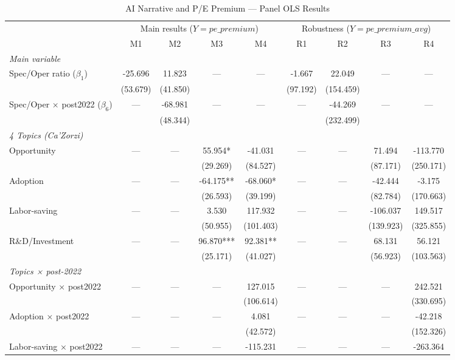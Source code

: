 \begin{table}[htbp]
\centering
\caption{AI Narrative and P/E Premium — Panel OLS Results}
\label{tab:regression_full}
\small
\begin{tabular}{lcccc|cccc}
\hline\hline
 & \multicolumn{4}{c|}{Main results ($Y = pe\_premium$)} & \multicolumn{4}{c}{Robustness ($Y = pe\_premium\_avg$)} \\
 & M1 & M2 & M3 & M4 & R1 & R2 & R3 & R4 \\
\hline
\multicolumn{9}{l}{\textit{Main variable}}\\
\quad Spec/Oper ratio ($\beta_1$) & -25.696 & 11.823 & — & — & -1.667 & 22.049 & — & — \\
  & (53.679) & (41.850) &  &  & (97.192) & (154.459) &  &  \\
\quad Spec/Oper × post2022 ($\beta_6$) & — & -68.981 & — & — & — & -44.269 & — & — \\
  &  & (48.344) &  &  &  & (232.499) &  &  \\
\multicolumn{9}{l}{\textit{4 Topics (Ca'Zorzi)}}\\
\quad Opportunity & — & — & 55.954* & -41.031 & — & — & 71.494 & -113.770 \\
  &  &  & (29.269) & (84.527) &  &  & (87.171) & (250.171) \\
\quad Adoption & — & — & -64.175** & -68.060* & — & — & -42.444 & -3.175 \\
  &  &  & (26.593) & (39.199) &  &  & (82.784) & (170.663) \\
\quad Labor-saving & — & — & 3.530 & 117.932 & — & — & -106.037 & 149.517 \\
  &  &  & (50.955) & (101.403) &  &  & (139.923) & (325.855) \\
\quad R\&D/Investment & — & — & 96.870*** & 92.381** & — & — & 68.131 & 56.121 \\
  &  &  & (25.171) & (41.027) &  &  & (56.923) & (103.563) \\
\multicolumn{9}{l}{\textit{Topics × post-2022}}\\
\quad Opportunity × post2022 & — & — & — & 127.015 & — & — & — & 242.521 \\
  &  &  &  & (106.614) &  &  &  & (330.695) \\
\quad Adoption × post2022 & — & — & — & 4.081 & — & — & — & -42.218 \\
  &  &  &  & (42.572) &  &  &  & (152.326) \\
\quad Labor-saving × post2022 & — & — & — & -115.231 & — & — & — & -263.364 \\

\end{tabular}
\end{table}
